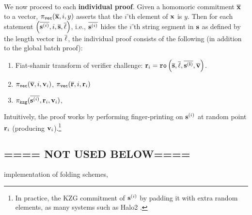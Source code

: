 We now proceed to each {\bf individual proof}. 
Given a homomoric commitment $\overline{{{\mathbf {x}}}}$ to a vector,
$\pi_{\texttt{vec}}(\overline{{{\mathbf {x}}}},i,y)$ asserts that the $i$'th
element of ${{\mathbf {x}}}$ is $y$. Then for each
statement $\left(\overline{{{\mathbf {s}}}^{(i)}}, i, \overline{{{\mathbf {s}}}}, 
\overline{{{\mathbf {\ell}}}}\right)$, i.e.,
$\overline{{{\mathbf {s}}}^{(i)}}$ hides the $i$'th string segment in ${{\mathbf {s}}}$
as defined by the length vector in $\overline{{{\mathbf {\ell}}}}$, 
the individual proof consists of the following (in addition
to the global batch proof):
\begin{enumerate}
	\item Fiat-shamir transform of verifier challenge: ${{\mathbf {r}}}_i = 
		\texttt{ro}\left(
		\overline{{{\mathbf {s}}}}, \overline{{{\mathbf {\ell}}}},
		\overline{{{\mathbf {s^{(i)}}}}}, \overline{{{\mathbf {v}}}}\right)$.
	\item 
		$\pi_{\texttt{vec}}(\overline{{{\mathbf {v}}}}, i, {{\mathbf {v}}}_i)$,
		$\pi_{\texttt{vec}}(\overline{{{\mathbf {r}}}}, i, {{\mathbf {r}}}_i)$
	\item $\pi_{\texttt{kzg}}(\overline{{{\mathbf {s}}}^{(i)}}, {{\mathbf {r}}}_i, {{\mathbf {v}}}_i)$,
\end{enumerate}

Intuitively, the proof works by
 performing finger-printing
 on ${{\mathbf {s}}}^{(i)}$ at random point ${{\mathbf {r}}}_i$ (producing
 ${{\mathbf {v}}}_i$).\footnote{In practice, the KZG commitment
 of ${{\mathbf {s}}}^{(i)}$ by padding it with extra random elements,
 as many systems such as Halo2 \cite{Halo2}.}
 
\subsection{==== NOT USED BELOW====}



implementation of folding schemes, 

